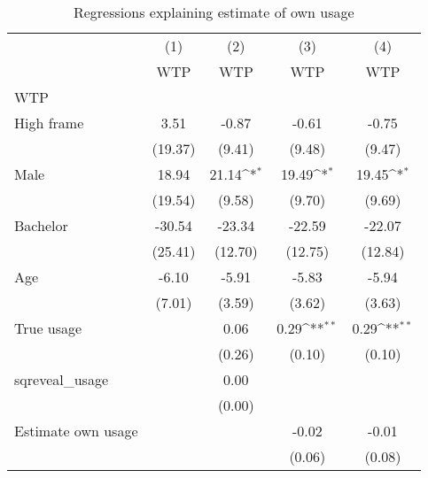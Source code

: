 \begin{table}[htbp]\centering
\def\sym#1{\ifmmode^{#1}\else\(^{#1}\)\fi}
\caption{Regressions explaining estimate of own usage}
\begin{tabular}{l*{4}{c}}
\hline\hline
                &\multicolumn{1}{c}{(1)}&\multicolumn{1}{c}{(2)}&\multicolumn{1}{c}{(3)}&\multicolumn{1}{c}{(4)}\\
                &\multicolumn{1}{c}{WTP}&\multicolumn{1}{c}{WTP}&\multicolumn{1}{c}{WTP}&\multicolumn{1}{c}{WTP}\\
\hline
WTP             &                  &                  &                  &                  \\
High frame      &     3.51         &    -0.87         &    -0.61         &    -0.75         \\
                &  (19.37)         &   (9.41)         &   (9.48)         &   (9.47)         \\
[1em]
Male            &    18.94         &    21.14\sym{*}  &    19.49\sym{*}  &    19.45\sym{*}  \\
                &  (19.54)         &   (9.58)         &   (9.70)         &   (9.69)         \\
[1em]
Bachelor        &   -30.54         &   -23.34         &   -22.59         &   -22.07         \\
                &  (25.41)         &  (12.70)         &  (12.75)         &  (12.84)         \\
[1em]
Age             &    -6.10         &    -5.91         &    -5.83         &    -5.94         \\
                &   (7.01)         &   (3.59)         &   (3.62)         &   (3.63)         \\
[1em]
True usage      &                  &     0.06         &     0.29\sym{**} &     0.29\sym{**} \\
                &                  &   (0.26)         &   (0.10)         &   (0.10)         \\
[1em]
sqreveal\_usage  &                  &     0.00         &                  &                  \\
                &                  &   (0.00)         &                  &                  \\
[1em]
Estimate own usage&                  &                  &    -0.02         &    -0.01         \\
                &                  &                  &   (0.06)         &   (0.08)         \\

\end{tabular}
\end{table}
